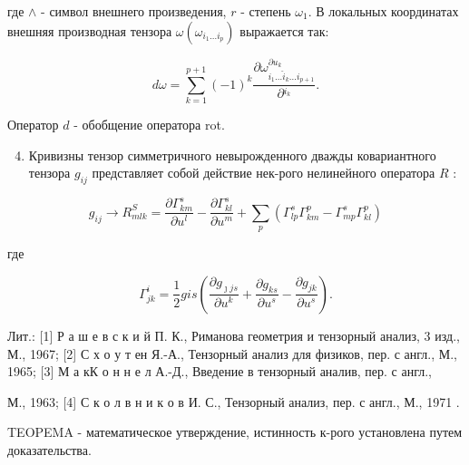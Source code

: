 \documentclass[10pt]{article}
\begin{document}
где $\wedge$ - символ внешнего произведения, $r$ - степень $\omega_{1}$. В локальных координатах внешняя производная тензора $\omega\left(\omega_{i_{1} \ldots i_{p}}\right)$ выражается так:



\[

d \omega=\sum_{k=1}^{p+1}(-1)^{k} \frac{\partial \omega_{i_{1} \ldots \hat{i}_{k} \ldots i_{p+1}}^{\partial u_{k}}}{\partial{ }^{i_{k}}} .

\]



Оператор $d$ - обобщение оператора rot.



\begin{enumerate}

  \setcounter{enumi}{3}

  \item Кривизны тензор симметричного невырожденного дважды ковариантного тензора $g_{i j}$ представляет собой действие нек-рого нелинейного оператора $R$ :

\end{enumerate}



\[

g_{i j} \rightarrow R_{m l k}^{S}=\frac{\partial \Gamma_{k m}^{s}}{\partial u^{l}}-\frac{\partial \Gamma_{k l}^{s}}{\partial u^{m}}+\sum_{p}\left(\Gamma_{l p}^{s} \Gamma_{k m}^{p}-\Gamma_{m p}^{s} \Gamma_{k l}^{p}\right)

\]



где



\[

\Gamma_{j k}^{i}=\frac{1}{2} g i s\left(\frac{\partial g_{\jmath j s}}{\partial u^{k}}+\frac{\partial g_{k s}}{\partial u^{s}}-\frac{\partial g_{j k}}{\partial u^{s}}\right) .

\]



Лит.: [1] Р а ш е в с к и й П. К., Риманова геометрия и тензорный анализ, 3 изд., М., 1967; [2] С х о у т ен Я.-А., Тензорный анализ для физиков, пер. с англ., М., 1965; [3] М а кК о н н е л А.-Д., Введение в тензорный аналив, пер. с англ.,

М., 1963; [4] С к о л в н и к о в И. С., Тензорный анализ, пер. с англ., М., 1971 .



TEOPEMA - математическое утверждение, истинность к-рого установлена путем доказательства.
\end{document}
